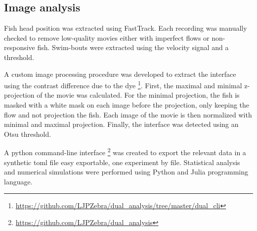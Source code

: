 \begin{appendices}
    \section{Image analysis}
     \label{auto_analysis}
    Fish head position was extracted using FastTrack. Each recording was manually checked to remove low-quality movies either with imperfect flows or non-responsive fish. Swim-bouts were extracted using the velocity signal and a threshold.

    A custom image processing procedure was developed to extract the interface using the contrast difference due to the dye \footnote{\url{https://github.com/LJPZebra/dual_analysis/tree/master/dual_cli}}. First, the maximal and minimal z-projection of the movie was calculated. For the minimal projection, the fish is masked with a white mask on each image before the projection, only keeping the flow and not projection the fish. Each image of the movie is then normalized with minimal and maximal projection. Finally, the interface was detected using an Otsu threshold.

    A python command-line interface \footnote{\url{https://github.com/LJPZebra/dual_analysis}} was created to export the relevant data in a synthetic toml file easy exportable, one experiment by file. Statistical analysis and numerical simulations were performed using Python and Julia programming language.


\end{appendices}
